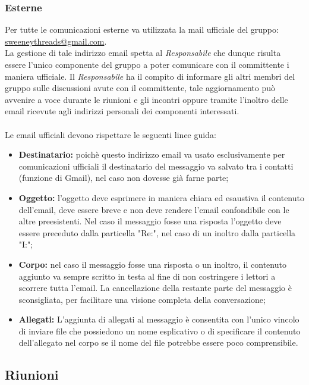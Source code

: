 \documentclass[a4paper]{report}
\begin{document}
	\subsubsection{Esterne}
	Per tutte le comunicazioni esterne va utilizzata la mail ufficiale del gruppo: \href{mailto:sweeneythreads@gmail.com}{sweeneythreads@gmail.com}.
	 \\ La gestione di tale indirizzo email spetta al \emph{Responsabile} che dunque risulta essere l'unico componente del gruppo a poter comunicare
	con il committente i maniera ufficiale. Il \emph{Responsabile} ha il compito di informare gli altri membri del gruppo sulle 
	discussioni avute con il committente, tale aggiornamento può avvenire a voce durante le riunioni e gli incontri oppure tramite
	l'inoltro delle email ricevute agli indirizzi personali dei componenti interessati.
	\\ \\
	Le email ufficiali devono rispettare le seguenti linee guida:
	\begin{itemize}
		\item \textbf{Destinatario:} poichè questo indirizzo email va usato esclusivamente per comunicazioni ufficiali il destinatario
		del messaggio va salvato tra i contatti (funzione di Gmail), nel caso non dovesse già farne parte;
		\item \textbf{Oggetto:} l'oggetto deve esprimere in maniera chiara ed esaustiva il contenuto dell'email, deve essere breve
		 e non deve rendere l'email confondibile con le altre preesistenti. 
		 Nel caso il messaggio fosse una risposta l'oggetto deve essere preceduto dalla particella "Re:", nel caso di un inoltro dalla
		 particella "I:";
		\item \textbf{Corpo:} nel caso il messaggio fosse una risposta o un inoltro, il contenuto aggiunto va sempre scritto in testa al
		fine di non costringere i lettori a scorrere tutta l'email. La cancellazione della restante parte del messaggio è sconsigliata, per
		facilitare una visione completa della conversazione;
		\item \textbf{Allegati:} L'aggiunta di allegati al messaggio è consentita con l'unico vincolo di inviare file che possiedono un nome
		esplicativo o di specificare il contenuto dell'allegato nel corpo se il nome del file potrebbe essere poco comprensibile.
	\end{itemize}										
	\subsection{Riunioni}
\end{document}
